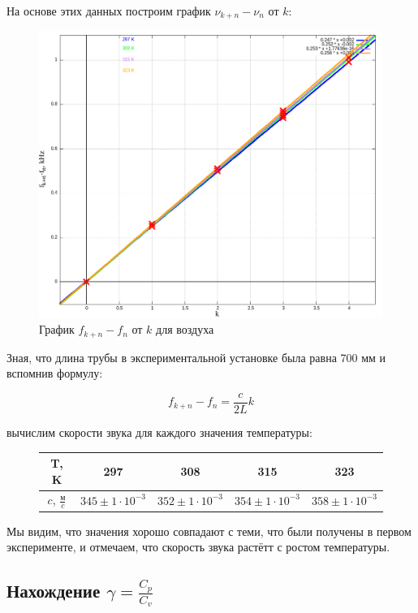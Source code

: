 \documentclass{article}
\begin{document}
На основе этих данных построим график $\nu_{k+n} - \nu_n$ от $k$:

\begin{figure}[H]
    \centering
    \includegraphics[width=\textwidth]{2/2.png}
    \caption{График $f_{k+n} - f_n$ от $k$ для воздуха}
\end{figure}

Зная, что длина трубы в экспериментальной установке была равна 700 мм и вспомнив формулу:

\[ f_{k+n} - f_n = \frac{c}{2L}k \]

вычислим скорости звука для каждого значения температуры:

\begin{figure}[H]
    \centering
    \begin{tabular}{|c|c|c|c|c|}
    \hline
    T, K & 297 & 308 & 315 & 323 \\\hline
    $c$, $\frac{\text{м}}{c}$ & $345 \pm 1\cdot10^{-3}$& $352 \pm 1\cdot10^{-3}$ & $354 \pm 1\cdot10^{-3}$ & $358 \pm 1\cdot10^{-3}$ \\\hline
    \end{tabular}
\end{figure}

Мы видим, что значения хорошо совпадают с теми, что были получены в первом эксперименте, и отмечаем, 
что скорость звука растётт с ростом температуры.

\subsection{Нахождение $\gamma = \frac{C_p}{C_v}$}
\end{document}
